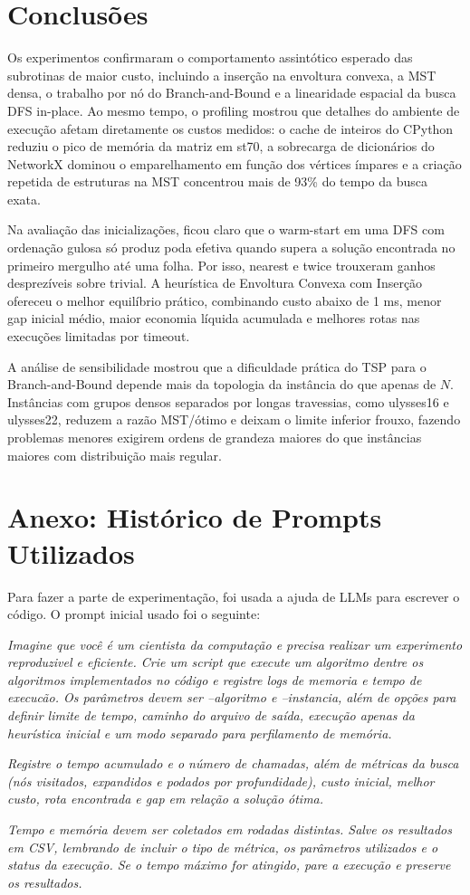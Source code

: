 \documentclass[12pt]{article}
\begin{document}
\section{Conclusões}
Os experimentos confirmaram o comportamento assintótico esperado das subrotinas de maior custo, incluindo a inserção na envoltura convexa, a MST densa, o trabalho por nó do Branch-and-Bound e a linearidade espacial da busca DFS in-place. Ao mesmo tempo, o profiling mostrou que detalhes do ambiente de execução afetam diretamente os custos medidos: o cache de inteiros do CPython reduziu o pico de memória da matriz em st70, a sobrecarga de dicionários do NetworkX dominou o emparelhamento em função dos vértices ímpares e a criação repetida de estruturas na MST concentrou mais de 93\% do tempo da busca exata.

Na avaliação das inicializações, ficou claro que o warm-start em uma DFS com ordenação gulosa só produz poda efetiva quando supera a solução encontrada no primeiro mergulho até uma folha. Por isso, nearest e twice trouxeram ganhos desprezíveis sobre trivial. A heurística de Envoltura Convexa com Inserção ofereceu o melhor equilíbrio prático, combinando custo abaixo de 1 ms, menor gap inicial médio, maior economia líquida acumulada e melhores rotas nas execuções limitadas por timeout.

A análise de sensibilidade mostrou que a dificuldade prática do TSP para o Branch-and-Bound depende mais da topologia da instância do que apenas de $N$. Instâncias com grupos densos separados por longas travessias, como ulysses16 e ulysses22, reduzem a razão MST/ótimo e deixam o limite inferior frouxo, fazendo problemas menores exigirem ordens de grandeza maiores do que instâncias maiores com distribuição mais regular.


\section*{Anexo: Histórico de Prompts Utilizados}
Para fazer a parte de experimentação, foi usada a ajuda de LLMs para escrever o código. O prompt inicial usado foi o seguinte:

\textit{Imagine que você é um cientista da computação e precisa realizar um experimento reproduzivel e eficiente. Crie um script que execute um algoritmo dentre os algoritmos implementados no código e registre logs de memoria e tempo de execucão. Os parâmetros devem ser --algoritmo e --instancia, além de opções para definir limite de tempo, caminho do arquivo de saída, execução apenas da heurística inicial e um modo separado para perfilamento de memória.}

\textit{Registre o tempo acumulado e o número de chamadas, além de métricas da busca (nós visitados, expandidos e podados por profundidade), custo inicial, melhor custo, rota encontrada e gap em relação a solução ótima.}

\textit{Tempo e memória devem ser coletados em rodadas distintas. Salve os resultados em CSV, lembrando de incluir o tipo de métrica, os parâmetros utilizados e o status da execução. Se o tempo máximo for atingido, pare a execução e preserve os resultados.}
\end{document}
